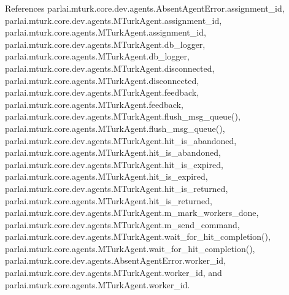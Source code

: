 References parlai.\+mturk.\+core.\+dev.\+agents.\+Absent\+Agent\+Error.\+assignment\+\_\+id, parlai.\+mturk.\+core.\+dev.\+agents.\+M\+Turk\+Agent.\+assignment\+\_\+id, parlai.\+mturk.\+core.\+agents.\+M\+Turk\+Agent.\+assignment\+\_\+id, parlai.\+mturk.\+core.\+dev.\+agents.\+M\+Turk\+Agent.\+db\+\_\+logger, parlai.\+mturk.\+core.\+agents.\+M\+Turk\+Agent.\+db\+\_\+logger, parlai.\+mturk.\+core.\+dev.\+agents.\+M\+Turk\+Agent.\+disconnected, parlai.\+mturk.\+core.\+agents.\+M\+Turk\+Agent.\+disconnected, parlai.\+mturk.\+core.\+dev.\+agents.\+M\+Turk\+Agent.\+feedback, parlai.\+mturk.\+core.\+agents.\+M\+Turk\+Agent.\+feedback, parlai.\+mturk.\+core.\+dev.\+agents.\+M\+Turk\+Agent.\+flush\+\_\+msg\+\_\+queue(), parlai.\+mturk.\+core.\+agents.\+M\+Turk\+Agent.\+flush\+\_\+msg\+\_\+queue(), parlai.\+mturk.\+core.\+dev.\+agents.\+M\+Turk\+Agent.\+hit\+\_\+is\+\_\+abandoned, parlai.\+mturk.\+core.\+agents.\+M\+Turk\+Agent.\+hit\+\_\+is\+\_\+abandoned, parlai.\+mturk.\+core.\+dev.\+agents.\+M\+Turk\+Agent.\+hit\+\_\+is\+\_\+expired, parlai.\+mturk.\+core.\+agents.\+M\+Turk\+Agent.\+hit\+\_\+is\+\_\+expired, parlai.\+mturk.\+core.\+dev.\+agents.\+M\+Turk\+Agent.\+hit\+\_\+is\+\_\+returned, parlai.\+mturk.\+core.\+agents.\+M\+Turk\+Agent.\+hit\+\_\+is\+\_\+returned, parlai.\+mturk.\+core.\+dev.\+agents.\+M\+Turk\+Agent.\+m\+\_\+mark\+\_\+workers\+\_\+done, parlai.\+mturk.\+core.\+dev.\+agents.\+M\+Turk\+Agent.\+m\+\_\+send\+\_\+command, parlai.\+mturk.\+core.\+dev.\+agents.\+M\+Turk\+Agent.\+wait\+\_\+for\+\_\+hit\+\_\+completion(), parlai.\+mturk.\+core.\+agents.\+M\+Turk\+Agent.\+wait\+\_\+for\+\_\+hit\+\_\+completion(), parlai.\+mturk.\+core.\+dev.\+agents.\+Absent\+Agent\+Error.\+worker\+\_\+id, parlai.\+mturk.\+core.\+dev.\+agents.\+M\+Turk\+Agent.\+worker\+\_\+id, and parlai.\+mturk.\+core.\+agents.\+M\+Turk\+Agent.\+worker\+\_\+id.


